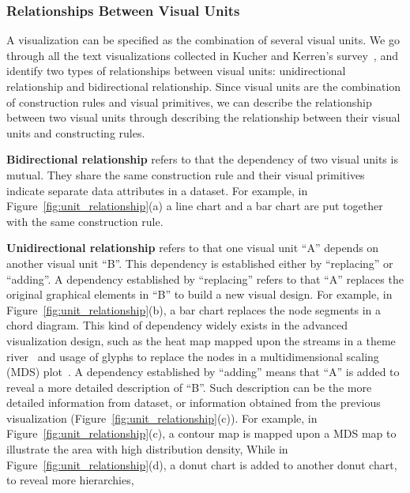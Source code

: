 \subsubsection{Relationships Between Visual Units}
A visualization can be specified as the combination of several visual units. 
We go through all the text visualizations collected in Kucher and Kerren's survey~\cite{kucher2015text}, and identify two types of relationships between visual units: unidirectional relationship and bidirectional relationship. Since visual units are the combination of construction rules and visual primitives, we can describe the relationship between two visual units through describing the relationship between their visual units and constructing rules.  

\textbf{Bidirectional relationship} refers to that the dependency of two visual units is mutual. They share the same construction rule and their visual primitives indicate separate data attributes in a dataset.
For example, in Figure~\ref{fig:unit_relationship}(a) a line chart and  a bar chart are put together with the same construction rule. 

\textbf{Unidirectional relationship} refers to that one visual unit ``A'' depends on another visual unit ``B''.  This dependency is established either by ``replacing'' or ``adding''. A dependency established by ``replacing'' refers to that ``A'' replaces the original graphical elements in ``B'' to build a new visual design. For example, in Figure~\ref{fig:unit_relationship}(b), a bar chart replaces the node segments in a chord diagram. This kind of dependency widely exists in the advanced visualization design, such as the heat map mapped upon the streams in a theme river~\cite{wu_opinionflow:_2014}  and usage of glyphs to replace the nodes in a multidimensional scaling (MDS) plot~\cite{chen_peakvizor:_2016}. A dependency established by ``adding'' means that ``A'' is added to reveal a more detailed description of ``B''. Such description can be the more detailed information from dataset, or information obtained from the previous visualization (Figure~\ref{fig:unit_relationship}(c)). For example, in Figure~\ref{fig:unit_relationship}(c), a contour map is mapped upon a MDS map to illustrate the area with high distribution density,  While in Figure~\ref{fig:unit_relationship}(d), a donut chart is added to another donut chart, to reveal more hierarchies, 


